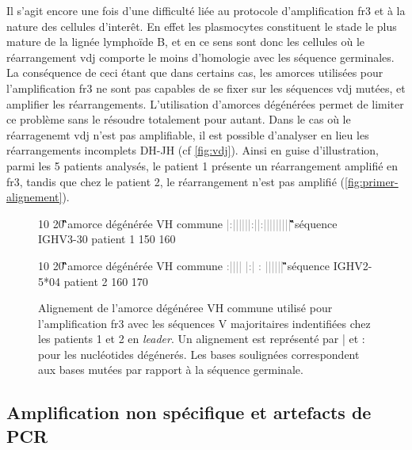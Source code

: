 Il s'agit encore une fois d'une difficulté liée au protocole d'amplification \gls{fr}3 et à la nature des cellules d'interêt. 
En effet les plasmocytes constituent le stade le plus mature de la lignée lymphoïde B, et en ce sens sont donc les cellules où le 
réarrangement \gls{vdj} comporte le moins d'homologie avec les séquence germinales. La conséquence de ceci étant que dans certains 
cas, les amorces utilisées pour l'amplification \gls{fr}3 ne sont pas capables de se fixer sur les séquences \gls{vdj} mutées, et 
amplifier les réarrangements. L'utilisation d'amorces dégénérées permet de limiter ce problème sans le résoudre totalement pour autant. 
Dans le cas où le réarragenemt \gls{vdj} n'est pas amplifiable, il est possible d'analyser en lieu les réarrangements incomplets DH-JH 
(cf \autoref{fig:vdj}). Ainsi en guise d'illustration, parmi les 5 patients analysés, le patient 1 présente un réarrangement amplifié 
en \gls{fr}3, tandis que chez le patient 2, le réarrangement n'est pas amplifié (\autoref{fig:primer-alignement}).

\begin{figure}[H]
    \centering
    \begin{ColoredVerbatim}
                10         20 
        \G\Hbase\G\G\A\C\A\C\N\G\C\Y\G\T\G\T\A\T\T\A\C amorce dégénérée VH commune
        \textcolor{gray}{|:||||||:||:|||||||||}
        \G\A\G\G\A\C\A\C\G\G\C\T\G\T\G\T\A\T\T\A\C séquence IGHV3-30 patient 1
           150       160

                10        20 
        \G\Hbase\G\G\A\C\A\C\N\G\C\Y\G\T\G\T\A\T\T\A\C amorce dégénérée VH commune
        \textcolor{gray}{ :|||| |:| :   ||||||}
        \A\T\G\G\A\C\Tb\C\A\G\G\C\A\C\Tb\T\A\T\T\A\C séquence IGHV2-5*04 patient 2
              160       170
    \end{ColoredVerbatim}
    \caption{
        Alignement de l'amorce dégénéree VH commune utilisé pour l'amplification \gls{fr}3 
        avec les séquences V majoritaires indentifiées chez les patients 1 et 2 en \textit{leader}. 
        Un alignement est représenté par | et : pour les nucléotides dégénerés. Les bases soulignées 
        correspondent aux bases mutées par rapport à la séquence germinale.
    }
    \label{fig:primer-alignement}
\end{figure}
    
\subsection{Amplification non spécifique et artefacts de PCR}

